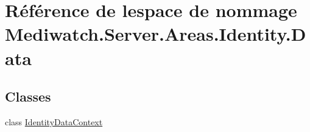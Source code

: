 \hypertarget{namespace_mediwatch_1_1_server_1_1_areas_1_1_identity_1_1_data}{}\section{Référence de l\textquotesingle{}espace de nommage Mediwatch.\+Server.\+Areas.\+Identity.\+Data}
\label{namespace_mediwatch_1_1_server_1_1_areas_1_1_identity_1_1_data}
\subsection*{Classes}
\begin{DoxyCompactItemize}
\item 
class \hyperlink{class_mediwatch_1_1_server_1_1_areas_1_1_identity_1_1_data_1_1_identity_data_context}{Identity\+Data\+Context}
\end{DoxyCompactItemize}
